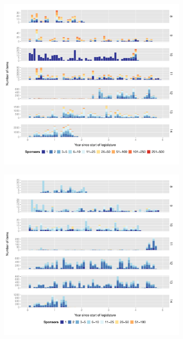 \documentclass[12pt,a4paper]{article}\usepackage[]{graphicx}\usepackage[]{color}
\begin{document}
\begin{figure}[htbp]
  \centering

  \begin{subfigure}[t]{.8\textwidth}
    \includegraphics[width=\textwidth]{../plots/counts/full_an.pdf}
    \label{fig:counts_an}
  \end{subfigure}

  \begin{subfigure}[t]{.8\textwidth}
    \includegraphics[width=\textwidth]{../plots/counts/full_se.pdf}
    \label{fig:counts_se}
  \end{subfigure}

  \label{fig:counts}
\end{figure}
\end{document}
